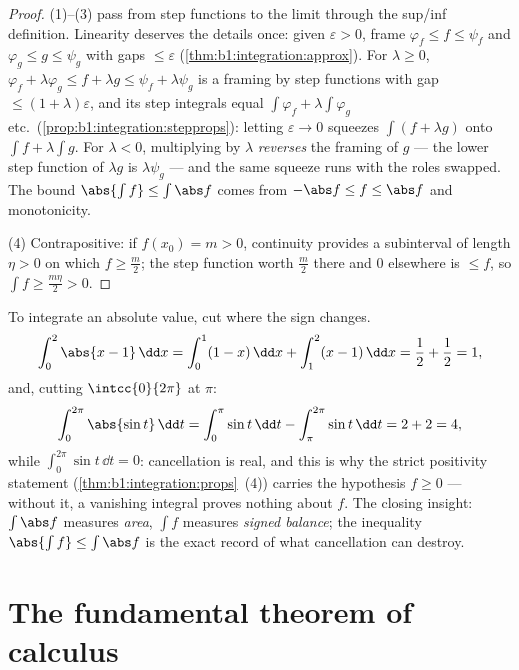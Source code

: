 \begin{proof}
(1)--(3) pass from step functions to the limit through the
sup/inf definition. Linearity deserves the details once: given
$\varepsilon > 0$, frame $\varphi_f \leq f \leq \psi_f$ and
$\varphi_g \leq g \leq \psi_g$ with gaps $\leq \varepsilon$
(\cref{thm:b1:integration:approx}). For $\lambda \geq 0$,
$\varphi_f + \lambda\varphi_g \leq f + \lambda g \leq \psi_f +
\lambda\psi_g$ is a framing by step functions with gap $\leq
(1 + \lambda)\varepsilon$, and its step integrals equal $\int
\varphi_f + \lambda\int\varphi_g$ etc.\
(\cref{prop:b1:integration:stepprops}): letting $\varepsilon \to
0$ squeezes $\int(f + \lambda g)$ onto $\int f + \lambda\int g$.
For $\lambda < 0$, multiplying by $\lambda$ \emph{reverses} the
framing of $g$ --- the lower step function of $\lambda g$ is
$\lambda \psi_g$ --- and the same squeeze runs with the roles
swapped. The bound $\abs{\int f} \leq \int \abs f$ comes from
$-\abs f \leq f \leq \abs f$ and monotonicity.

(4) Contrapositive: if $f(x_0) = m > 0$, continuity provides a
subinterval of length $\eta > 0$ on which $f \geq \frac m2$; the
step function worth $\frac m2$ there and $0$ elsewhere is $\leq f$,
so $\int f \geq \frac{m\eta}{2} > 0$.
\end{proof}

\begin{example}\label{ex:b1:integration:chasleswork}
To integrate an absolute value, cut where the sign changes.
\[
\int_0^2 \abs{x - 1}\,\dd x
= \int_0^1 (1 - x)\,\dd x + \int_1^2 (x - 1)\,\dd x
= \frac12 + \frac12 = 1 ,
\]
and, cutting $\intcc{0}{2\pi}$ at $\pi$:
\[
\int_0^{2\pi} \abs{\sin t}\,\dd t
= \int_0^{\pi} \sin t\,\dd t - \int_{\pi}^{2\pi} \sin t\,\dd t
= 2 + 2 = 4 ,
\]
while $\int_0^{2\pi} \sin t\,\dd t = 0$: cancellation is real,
and this is why the strict positivity statement
(\cref{thm:b1:integration:props}~(4)) carries the hypothesis $f
\geq 0$ --- without it, a vanishing integral proves nothing
about $f$. The closing insight: $\int \abs f$ measures
\emph{area}, $\int f$ measures \emph{signed balance}; the
inequality $\abs{\int f} \leq \int\abs f$ is the exact record of
what cancellation can destroy.
\end{example}

\section{The fundamental theorem of calculus}

